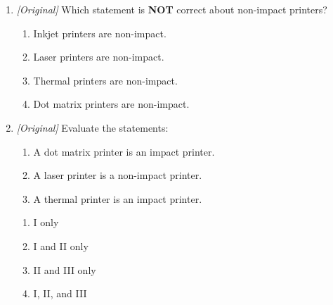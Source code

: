 \begin{enumerate}[label=\textbf{Q\arabic*.}, leftmargin=*]
\begin{enumerate}[label=\Alph*.]
    \item dots per inch (DPI)
  \end{enumerate}
\item \textit{[Original]} Which statement is \textbf{NOT} correct about
  non-impact printers?
  \begin{enumerate}[label=\Alph*.]
    \item Inkjet printers are non-impact.
    \item Laser printers are non-impact.
    \item Thermal printers are non-impact.
    \item Dot matrix printers are non-impact.
  \end{enumerate}
\item \textit{[Original]} Evaluate the statements:
  \begin{enumerate}[label=\Roman*.]
    \item A dot matrix printer is an impact printer.
    \item A laser printer is a non-impact printer.
    \item A thermal printer is an impact printer.
  \end{enumerate}
  \begin{enumerate}[label=\Alph*.]
    \item I only
    \item I and II only
    \item II and III only
    \item I, II, and III
  \end{enumerate}


\end{enumerate}
